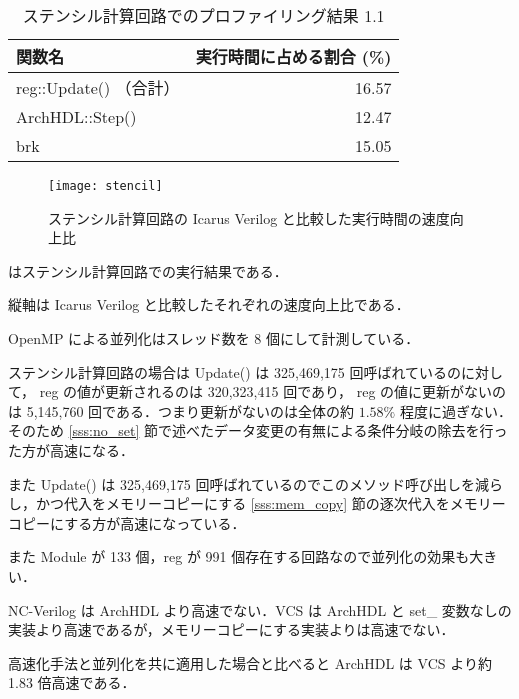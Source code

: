 \begin{table}[t]
 \caption{ステンシル計算回路でのプロファイリング結果 1.1}
 \label{table:stencil_prof1.1}
 \begin{center}
  \begin{tabular}{lr} \toprule
  関数名 & 実行時間に占める割合 (\%) \\ \midrule
  reg::Update() （合計） & 16.57 \\
  ArchHDL::Step() & 12.47 \\
  brk & 15.05 \\ \bottomrule
  \end{tabular}
 \end{center}
\end{table}

\fi

\begin{figure}[t]
 \centering
 \texttt{[image: stencil]}
 \caption{ステンシル計算回路の Icarus Verilog と比較した実行時間の速度向上比}
 \label{fig:stencil}
\end{figure}

 はステンシル計算回路での実行結果である．

縦軸は Icarus Verilog と比較したそれぞれの速度向上比である．

OpenMP による並列化はスレッド数を 8 個にして計測している．

ステンシル計算回路の場合は Update() は 325,469,175
回呼ばれているのに対して， reg の値が更新されるのは 320,323,415
回であり， reg の値に更新がないのは 5,145,760
回である．つまり更新がないのは全体の約 $1.58\%$ 程度に過ぎない．そのため
\ref{sss:no_set}
節で述べたデータ変更の有無による条件分岐の除去を行った方が高速になる．

また Update() は 325,469,175
回呼ばれているのでこのメソッド呼び出しを減らし，かつ代入をメモリーコピーにする
\ref{sss:mem_copy}
節の逐次代入をメモリーコピーにする方が高速になっている．

また Module が 133 個，reg が 991
個存在する回路なので並列化の効果も大きい．

NC-Verilog は ArchHDL より高速でない．VCS は ArchHDL と set\_
変数なしの実装より高速であるが，メモリーコピーにする実装よりは高速でない．

高速化手法と並列化を共に適用した場合と比べると ArchHDL は VCS より約 1.83 倍高速である．





